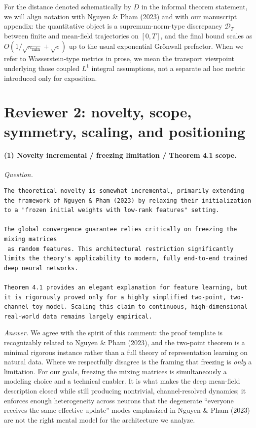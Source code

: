 \documentclass[11pt,a4paper]{article}
\newcommand{\NP}{Nguyen \& Pham (2023)}
\begin{document}
For the distance denoted schematically by $D$ in the informal theorem statement, we will align notation with \NP{} and with our manuscript appendix: the quantitative object is a supremum-norm-type discrepancy $\mathscr{D}_T$ between finite and mean-field trajectories on $[0,T]$, and the final bound scales as $O(1/\sqrt{n_{\min}}+\sqrt{\epsilon})$ up to the usual exponential Grönwall prefactor. When we refer to Wasserstein-type metrics in prose, we mean the transport viewpoint underlying those coupled $L^1$ integral assumptions, not a separate ad hoc metric introduced only for exposition.


\section*{Reviewer 2: novelty, scope, symmetry, scaling, and positioning}

\paragraph{(1) Novelty incremental / freezing limitation / Theorem 4.1 scope.}
\textit{Question.}\par
\begin{verbatim}
The theoretical novelty is somewhat incremental, primarily extending the framework of Nguyen & Pham (2023) by relaxing their initialization to a "frozen initial weights with low-rank features" setting.

The global convergence guarantee relies critically on freezing the mixing matrices 
 as random features. This architectural restriction significantly limits the theory's applicability to modern, fully end-to-end trained deep neural networks.

Theorem 4.1 provides an elegant explanation for feature learning, but it is rigorously proved only for a highly simplified two-point, two-channel toy model. Scaling this claim to continuous, high-dimensional real-world data remains largely empirical.
\end{verbatim}
\textit{Answer.} We agree with the spirit of this comment: the proof template is recognizably related to \NP{}, and the two-point theorem is a minimal rigorous instance rather than a full theory of representation learning on natural data. Where we respectfully disagree is the framing that freezing is \emph{only} a limitation. For our goals, freezing the mixing matrices is simultaneously a modeling choice and a technical enabler. It is what makes the deep mean-field description closed while still producing nontrivial, channel-resolved dynamics; it enforces enough heterogeneity across neurons that the degenerate ``everyone receives the same effective update'' modes emphasized in \NP{} are not the right mental model for the architecture we analyze.
\end{document}
